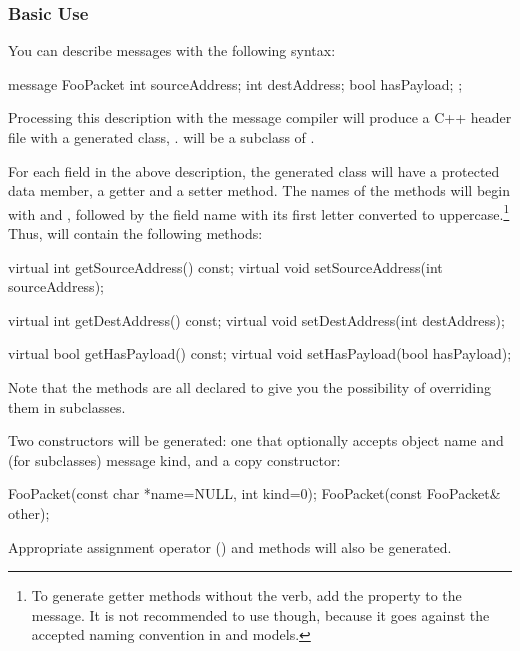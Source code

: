 \subsubsection{Basic Use}

You can describe messages with the following syntax:

\begin{msg}
message FooPacket
{
    int sourceAddress;
    int destAddress;
    bool hasPayload;
};
\end{msg}

Processing this description with the message compiler will produce
a C++ header file with a generated class, .
 will be a subclass of .

For each field in the above description, the generated class will have
a protected data member, a getter and a setter method. The names of the
methods will begin with  and , followed by the field name
with its first letter converted to uppercase.\footnote{
  To generate getter methods without the  verb, add the
   property to the message. It is not recommended
  to use  though, because it goes against the
  accepted naming convention in {\opp} and models.}
Thus,  will contain the following methods:

\begin{cpp}
virtual int getSourceAddress() const;
virtual void setSourceAddress(int sourceAddress);

virtual int getDestAddress() const;
virtual void setDestAddress(int destAddress);

virtual bool getHasPayload() const;
virtual void setHasPayload(bool hasPayload);
\end{cpp}

Note that the methods are all declared  to give you the possibility
of overriding them in subclasses.

Two constructors will be generated: one that optionally accepts object name and
(for  subclasses) message kind, and a copy constructor:

\begin{cpp}
FooPacket(const char *name=NULL, int kind=0);
FooPacket(const FooPacket& other);
\end{cpp}

Appropriate assignment operator () and  methods will
also be generated.


